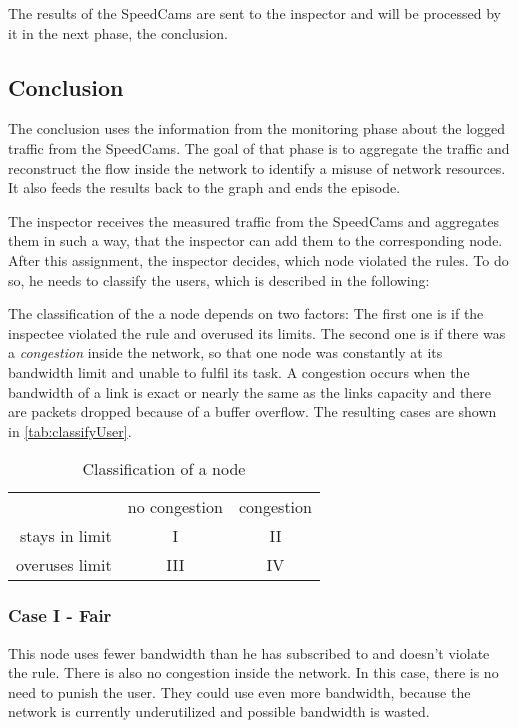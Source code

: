 \documentclass[thesis.tex]{subfiles}
\begin{document}
The results of the SpeedCams are sent to the inspector and will be processed by it in the next phase, the conclusion.

\subsection{Conclusion} \label{sec:main:conclusionphase}
The conclusion uses the information from the monitoring phase about the logged traffic from the SpeedCams. The goal of that phase is to aggregate the traffic and reconstruct the flow inside the network to identify a misuse of network resources. It also feeds the results back to the graph and ends the episode.

The inspector receives the measured traffic from the SpeedCams and aggregates them in such a way, that the inspector can add them to the corresponding node. After this assignment, the inspector decides, which node violated the rules. To do so, he needs to classify the users, which is described in the following:

The classification of the a node depends on two factors: The first one is if the inspectee violated the rule and overused its limits. The second one is if there was a \textit{congestion} inside the network, so that one node was constantly at its bandwidth limit and unable to fulfil its task. A congestion occurs when the bandwidth of a link is exact or nearly the same as the links capacity and there are packets dropped because of a buffer overflow. The resulting cases are shown in \autoref{tab:classifyUser}.

\begin{table}[h]
    \centering
    \begin{tabular}{ r|c|c| }
        \multicolumn{1}{r}{}
        &  \multicolumn{1}{c}{no congestion}
        & \multicolumn{1}{c}{congestion} \\
        \cline{2-3}
        stays in limit & I & II \\
        \cline{2-3}
        overuses limit & III & IV \\
        \cline{2-3}
    \end{tabular}
    \caption{Classification of a node}
    \label{tab:classifyUser}    
\end{table}

\subsubsection{Case I - Fair} \label{sub:main:detection:case1}
This node uses fewer bandwidth than he has subscribed to and doesn't violate the rule. There is also no congestion inside the network. In this case, there is no need to punish the user. They could use even more bandwidth, because the network is currently underutilized and possible bandwidth is wasted.
\end{document}
